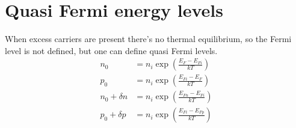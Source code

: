 \documentclass[article,oneside]{memoir}
\begin{document}
\chapter{Quasi Fermi energy levels}
When excess carriers are present there's no thermal equilibrium, so the Fermi level is not defined, but one can define quasi Fermi levels.
\begin{align*}
        n_0&=n_i\exp\left( \frac{E_{F}-E_{Fi}}{kT} \right)\\
        p_0&=n_i\exp\left( \frac{E_{Fi}-E_{F}}{kT} \right)\\
        n_0 + \delta n&=n_i\exp\left( \frac{E_{Fn}-E_{Fi}}{kT} \right)\\
        p_0 + \delta p&=n_i\exp\left( \frac{E_{Fi}-E_{Fp}}{kT} \right)\\
\end{align*}
\end{document}
